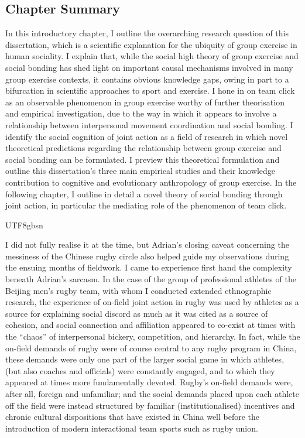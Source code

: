 \begin{CJK}{UTF8}{gbsn}
\subsection{Chapter Summary}
In this introductory chapter, I outline the overarching research question of this dissertation, which is a scientific explanation for the ubiquity of group exercise in human sociality.  I explain that, while the social high theory of group exercise and social bonding has shed light on important causal mechanisms involved in many group exercise contexts, it contains obvious knowledge gaps, owing in part to a bifurcation in scientific approaches to sport and exercise.  I hone in on team click as an observable phenomenon in group exercise worthy of further theorisation and empirical investigation, due to the way in which it appears to involve a relationship between interpersonal movement coordination and social bonding.  I identify the social cognition of joint action as a field of research in which novel theoretical predictions regarding the relationship between group exercise and social bonding can be formulated.  I preview this theoretical formulation and outline this dissertation's three main empirical studies and their knowledge contribution to cognitive and evolutionary anthropology of group exercise.  In the following chapter, I outline in detail a novel theory of social bonding through joint action, in particular the mediating role of the phenomenon of team click.





                                              \end{CJK}{UTF8}{gbsn}



I did not fully realise it at the time, but Adrian's closing caveat concerning the messiness of the Chinese rugby circle also helped guide my observations during the ensuing months of fieldwork.  I came to experience first hand the complexity beneath Adrian's sarcasm.  In the case of the group of professional athletes of the Beijing men's rugby team, with whom I conducted extended ethnographic research, the experience of on-field joint action in rugby was used by athletes as a source for explaining social discord as much as it was cited as a source of cohesion, and social connection and affiliation appeared to co-exist at times with the ``chaos'' of interpersonal bickery, competition, and hierarchy.  In fact, while the on-field demands of rugby were of course central to any rugby program in China, these demands were only one part of the larger social game in which athletes, (but also coaches and officials) were constantly engaged, and to which they appeared at times more fundamentally devoted. Rugby's on-field demands were, after all, foreign and unfamiliar; and the social demands placed upon each athlete off the field were instead structured by familiar (institutionalised) incentives and chronic cultural dispositions that have existed in China well before the introduction of modern interactional team sports such as rugby union.


